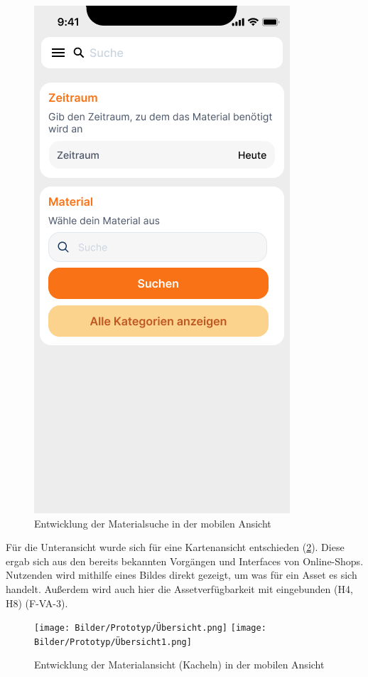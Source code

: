 \begin{figure}[h]
    \includegraphics[scale=0.3]{Bilder/Prototyp/Neu/Suche V2.png}
    \caption{Entwicklung der Materialsuche in der mobilen Ansicht}
    \label{fig:p1}
\end{figure}

Für die Unteransicht wurde sich für eine Kartenansicht entschieden
(\ref{fig:ubersicht}). Diese ergab sich aus den bereits bekannten Vorgängen und
Interfaces von Online-Shops. Nutzenden wird mithilfe eines Bildes direkt
gezeigt, um was für ein Asset es sich handelt. Außerdem wird auch hier die
Assetverfügbarkeit mit eingebunden (H4, H8) (F-VA-3).

\begin{figure}[h]
    \centering
    \texttt{[image: Bilder/Prototyp/Übersicht.png]}\hspace{2em}
    \texttt{[image: Bilder/Prototyp/Übersicht1.png]}
    \caption{Entwicklung der Materialansicht (Kacheln) in der mobilen Ansicht}
    \label{fig:ubersicht}
\end{figure}

